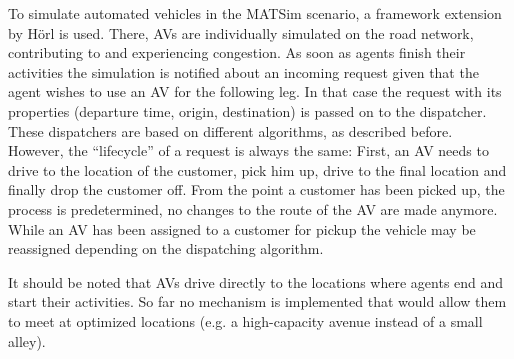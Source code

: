 To simulate automated vehicles in the MATSim scenario, a framework extension by
Hörl \cite{horl_abmtrans17} is used. There, AVs are individually simulated on the
road network, contributing to and experiencing congestion. As soon as agents
finish their activities the simulation is notified about an incoming request
given that the agent wishes to use an AV for the following leg. In that case
the request with its properties (departure time, origin, destination) is passed
on to the dispatcher. These dispatchers are based on different algorithms, as
described before. However, the ``lifecycle'' of a request is always the same: First,
an AV needs to drive to the location of the customer, pick him up, drive to the
final location and finally drop the customer off. From the point a customer has
been picked up, the process is predetermined, no changes to the route of the AV
are made anymore. While an AV has been assigned to a customer for pickup the
vehicle may be reassigned depending on the dispatching algorithm.

It should be noted that AVs drive directly to the locations where agents end and
start their activities. So far no mechanism is implemented that would allow them
to meet at optimized locations (e.g. a high-capacity avenue instead of a small
alley).

